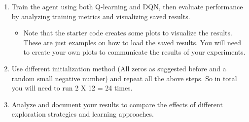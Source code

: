 \documentclass[12pt]{article}
\begin{document}
\begin{enumerate}
    
     Files beginning with \texttt{Q\_learning} will use classical Q-learning. Files beginning with \texttt{DQN} will use Deep Q-Learning. You should have some justification or purpose when changing hyperparameters and you will need to report on these changes.
  \item Train the agent using both Q-learning and DQN, then evaluate performance by analyzing training metrics and visualizing saved results.
  \begin{itemize}
    \item Note that the starter code creates some plots to visualize the results. These are just examples on how to load the saved results. You will need to create your own plots to communicate the results of your experiments.
  \end{itemize}
  \item Use different initialization method (All zeros as suggested before and a random small negative number) and repeat all the above steps. So in total you will need to run 2 X 12 = 24 times.
  \item Analyze and document your results to compare the effects of different exploration strategies and learning approaches.
\end{enumerate}
\end{document}
